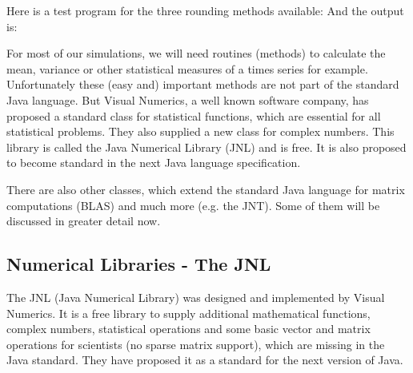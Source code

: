 Here is a test program for the three rounding methods available:
And the output is:


For most of our simulations, we will need routines (methods) to
calculate the mean, variance or other statistical measures of
a times series for example. Unfortunately
these (easy and) important methods are not part of the
standard Java language. But Visual Numerics, a well known software company,
has proposed a standard class for statistical functions, which are
essential for all statistical problems. They also supplied a new class
for complex numbers. This library is called the Java Numerical Library
(JNL) and is free. It is also proposed to become standard in the
next Java language specification.

There are also other classes, which extend the standard Java language
for matrix computations (BLAS) and much more (e.g. the JNT). Some of 
them will be discussed in greater detail now.

\subsection{Numerical Libraries - The JNL}
The JNL (Java Numerical Library) was designed and implemented by 
Visual Numerics. It is a free library to supply additional 
mathematical functions, complex numbers, statistical operations 
and some basic vector and matrix operations for scientists (no
sparse matrix support), which
are missing in the Java standard. They have proposed it as a
standard for the next version of Java.

